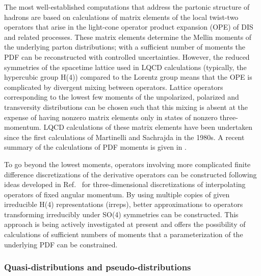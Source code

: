 The most well-established computations that address the partonic structure of hadrons are based on calculations of matrix elements of the local twist-two operators that arise in the light-cone operator product expansion (OPE) of DIS and related processes. These matrix elements determine the Mellin moments of the underlying parton distributions; with  a sufficient number of moments the PDF can be reconstructed with controlled uncertainties. However, the reduced symmetries of the spacetime lattice used in LQCD calculations (typically, the hypercubic group H(4)) compared to the Lorentz group means that the OPE is complicated by divergent mixing between operators.
Lattice operators corresponding to the lowest few moments of the unpolarized, polarized and transversity distributions can be chosen such that this mixing is absent at the expense of having nonzero matrix elements only in states of nonzero three-momentum. LQCD calculations of these matrix elements have been undertaken since the first calculations of Martinelli and Sachrajda \cite{Dawson:1997ic} in the 1980s. A recent summary of the calculations of PDF moments is given in \cite{Lin:2017snn}.
	
To go beyond the lowest moments, operators involving more complicated finite difference discretizations of the derivative operators can be constructed following ideas developed in Ref.~\cite{Davoudi:2012ya} for  three-dimensional discretizations of interpolating operators of fixed angular momentum. By using multiple copies of given irreducible H(4) representations (irreps), better approximations to operators transforming irreducibly under SO(4) symmetries can be constructed. This approach is being actively investigated at present \cite{IDavoudiLattice2018} and offers the possibility of calculations of sufficient numbers of moments that a parameterization of the underlying PDF can be constrained.



\subsubsection{Quasi-distributions and pseudo-distributions}



 

